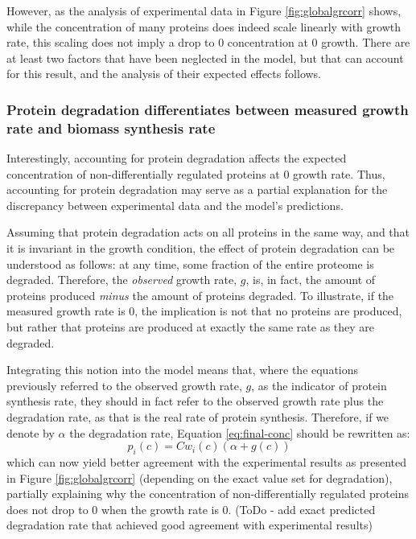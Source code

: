 \documentclass[notitlepage]{article}
\begin{document}
However, as the analysis of experimental data in Figure \ref{fig:globalgrcorr} shows, while the concentration of many proteins does indeed scale linearly with growth rate, this scaling does not imply a drop to 0 concentration at 0 growth.
There are at least two factors that have been neglected in the model, but that can account for this result, and the analysis of their expected effects follows.

\subsubsection{Protein degradation differentiates between measured growth rate and biomass synthesis rate}
Interestingly, accounting for protein degradation affects the expected concentration of non-differentially regulated proteins at 0 growth rate.
Thus, accounting for protein degradation may serve as a partial explanation for the discrepancy between experimental data and the model's predictions.

Assuming that protein degradation acts on all proteins in the same way, and that it is invariant in the growth condition, the effect of protein degradation can be understood as follows: at any time, some fraction of the entire proteome is degraded.
Therefore, the \emph{observed} growth rate, $g$, is, in fact, the amount of proteins produced \emph{minus} the amount of proteins degraded.
To illustrate, if the measured growth rate is 0, the implication is not that no proteins are produced, but rather that proteins are produced at exactly the same rate as they are degraded.

Integrating this notion into the model means that, where the equations previously referred to the observed growth rate, $g$, as the indicator of protein synthesis rate, they should in fact refer to the observed growth rate plus the degradation rate, as that is the real rate of protein synthesis.
Therefore, if we denote by $\alpha$ the degradation rate, Equation \ref{eq:final-conc} should be rewritten as:
\begin{equation}
  \label{eq:final-conc-deg}
  p_i(c)=Cw_i(c)(\alpha+g(c))
\end{equation}
which can now yield better agreement with the experimental results as presented in Figure \ref{fig:globalgrcorr} (depending on the exact value set for degradation), partially explaining why the concentration of non-differentially regulated proteins does not drop to 0 when the growth rate is 0.
(ToDo - add exact predicted degradation rate that achieved good agreement with experimental results)
\end{document}
